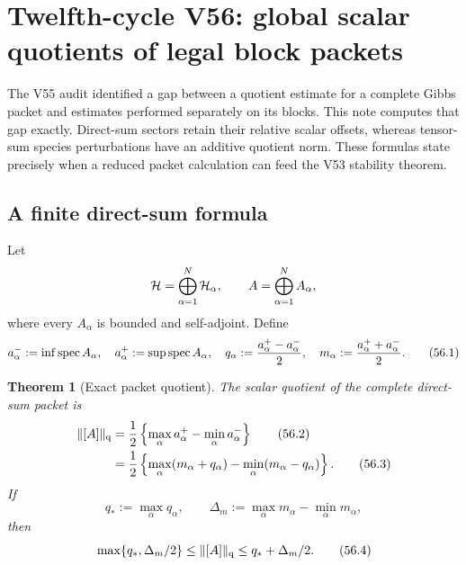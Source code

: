 \documentclass[11pt]{article}
\newtheorem{theorem}{Theorem}[section]
\theoremstyle{remark}
\begin{document}

\section{Twelfth-cycle V56: global scalar quotients of legal block
packets}
\label{sec:v12v56}

The V55 audit identified a gap between a quotient estimate for a
complete Gibbs packet and estimates performed separately on its
blocks.  This note computes that gap exactly.  Direct-sum sectors
retain their relative scalar offsets, whereas tensor-sum species
perturbations have an additive quotient norm.  These formulas state
precisely when a reduced packet calculation can feed the V53
stability theorem.

\subsection{A finite direct-sum formula}

Let
\[
 {\cal H}=\bigoplus_{\alpha=1}^N{\cal H}_\alpha,
 \qquad
 A=\bigoplus_{\alpha=1}^N A_\alpha,
\]
where every \(A_\alpha\) is bounded and self-adjoint.  Define
\begin{equation}
 a_\alpha^-:=\inf\operatorname{spec}A_\alpha,
 \quad
 a_\alpha^+:=\sup\operatorname{spec}A_\alpha,
 \quad
 q_\alpha:={a_\alpha^+-a_\alpha^-\over2},
 \quad
 m_\alpha:={a_\alpha^++a_\alpha^-\over2}.         \tag{56.1}
\end{equation}

\begin{theorem}[Exact packet quotient]
\label{thm:v12v56-direct-sum}
The scalar quotient of the complete direct-sum packet is
\begin{align}
 \|[A]\|_{\rm q}
 &=
 {1\over2}
 \left\{
 \max_\alpha a_\alpha^+
 -
 \min_\alpha a_\alpha^-
 \right\}                                         \tag{56.2}\\
 &=
 {1\over2}
 \left\{
 \max_\alpha(m_\alpha+q_\alpha)
 -
 \min_\alpha(m_\alpha-q_\alpha)
 \right\}.                                        \tag{56.3}
\end{align}
If
\[
 q_*:=\max_\alpha q_\alpha,
 \qquad
 \Delta_m:=\max_\alpha m_\alpha-\min_\alpha m_\alpha,
\]
then
\begin{equation}
 \max\{q_*,\Delta_m/2\}
 \leq\|[A]\|_{\rm q}
 \leq q_*+\Delta_m/2.                             \tag{56.4}
\end{equation}
\end{theorem}
\end{document}
